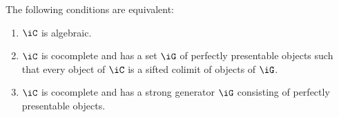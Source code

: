 \documentclass{zett}
\begin{document}
\begin{thm}\label{thm:characterization-of-algebraic-categories}
  The following conditions are equivalent:
  \begin{enumerate}
  \item $\iC$ is algebraic.
  \item $\iC$ is cocomplete and has a set $\iG$ of perfectly presentable objects such that every object of $\iC$ is a sifted colimit of objects of $\iG$.
  \item $\iC$ is cocomplete and has a strong generator $\iG$ consisting of perfectly presentable objects.
  \end{enumerate}
\end{thm}
\end{document}

